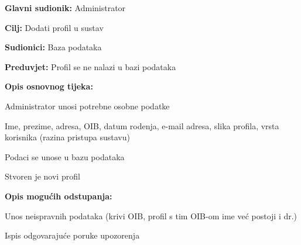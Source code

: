		   	\noindent {}
				\begin{packed_item}
						
						\item \textbf{Glavni sudionik: }Administrator
						\item  \textbf{Cilj:} Dodati profil u sustav
						\item  \textbf{Sudionici:} Baza podataka
						\item  \textbf{Preduvjet:} Profil se ne nalazi u bazi podataka
						\item  \textbf{Opis osnovnog tijeka:}
						
						\item[] \begin{packed_enum}
							
							\item Administrator unosi potrebne osobne podatke
							\begin{packed_enum}
								\item Ime, prezime, adresa, OIB, datum rodenja, e-mail adresa, slika profila, vrsta korisnika (razina pristupa sustavu)
							\end{packed_enum}
							\item Podaci se unose u bazu podataka
							\item Stvoren je novi profil
							
						\end{packed_enum}
						
						\item  \textbf{Opis mogućih odstupanja:}
						
						\item[] \begin{packed_item}
							
							\item[1.a] Unos neispravnih podataka (krivi OIB, profil s tim OIB-om ime već postoji i dr.)
							\item[] \begin{packed_enum}
								
								\item Ispis odgovarajuće poruke upozorenja
								
							\end{packed_enum}
							
						\end{packed_item}
					\end{packed_item}
				
